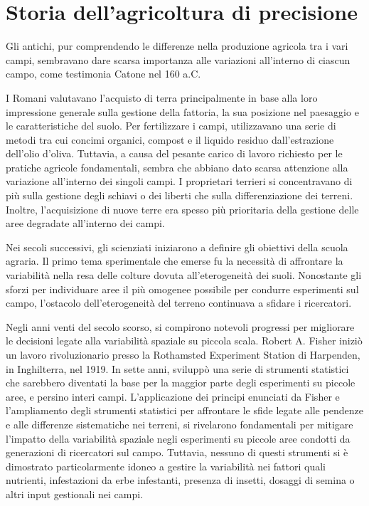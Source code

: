 \section{Storia dell'agricoltura di precisione}

Gli antichi, pur comprendendo le differenze nella produzione agricola tra i vari campi, sembravano dare scarsa importanza alle variazioni all'interno di ciascun campo, come testimonia Catone nel 160 a.C. 

I Romani valutavano l'acquisto di terra principalmente in base alla loro impressione generale sulla gestione della fattoria, la sua posizione nel paesaggio e le caratteristiche del suolo. Per fertilizzare i campi, utilizzavano una serie di metodi tra cui concimi organici, compost e il liquido residuo dall'estrazione dell'olio d'oliva. Tuttavia, a causa del pesante carico di lavoro richiesto per le pratiche agricole fondamentali, sembra che abbiano dato scarsa attenzione alla variazione all'interno dei singoli campi. I proprietari terrieri si concentravano di più sulla gestione degli schiavi o dei liberti che sulla differenziazione dei terreni. Inoltre, l'acquisizione di nuove terre era spesso più prioritaria della gestione delle aree degradate all'interno dei campi. 

Nei secoli successivi, gli scienziati iniziarono a definire gli obiettivi della scuola agraria. Il primo tema sperimentale che emerse fu la necessità di affrontare la variabilità nella resa delle colture dovuta all'eterogeneità dei suoli. Nonostante gli sforzi per individuare aree il più omogenee possibile per condurre esperimenti sul campo, l'ostacolo dell'eterogeneità del terreno continuava a sfidare i ricercatori. 

Negli anni venti del secolo scorso, si compirono notevoli progressi per migliorare le decisioni legate alla variabilità spaziale su piccola scala. Robert A. Fisher iniziò un lavoro rivoluzionario presso la Rothamsted Experiment Station di Harpenden, in Inghilterra, nel 1919. In sette anni, sviluppò una serie di strumenti statistici che sarebbero diventati la base per la maggior parte degli esperimenti su piccole aree, e persino interi campi. L'applicazione dei principi enunciati da Fisher e l'ampliamento degli strumenti statistici per affrontare le sfide legate alle pendenze e alle differenze sistematiche nei terreni, si rivelarono fondamentali per mitigare l'impatto della variabilità spaziale negli esperimenti su piccole aree condotti da generazioni di ricercatori sul campo. Tuttavia, nessuno di questi strumenti si è dimostrato particolarmente idoneo a gestire la variabilità nei fattori quali nutrienti, infestazioni da erbe infestanti, presenza di insetti, dosaggi di semina o altri input gestionali nei campi.

